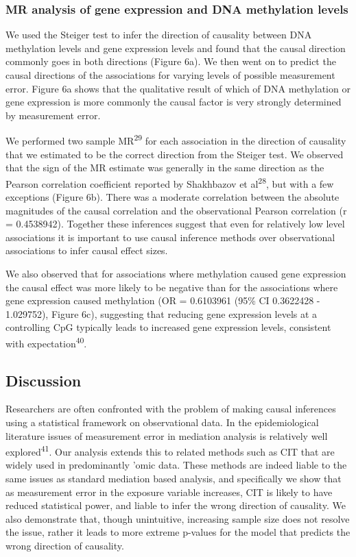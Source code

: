 \documentclass[]{article}
\begin{document}
\subsubsection{MR analysis of gene expression and DNA methylation
levels}\label{mr-analysis-of-gene-expression-and-dna-methylation-levels}

We used the Steiger test to infer the direction of causality between DNA
methylation levels and gene expression levels and found that the causal
direction commonly goes in both directions (Figure 6a). We then went on
to predict the causal directions of the associations for varying levels
of possible measurement error. Figure 6a shows that the qualitative
result of which of DNA methylation or gene expression is more commonly
the causal factor is very strongly determined by measurement error.

We performed two sample MR\textsuperscript{29} for each association in
the direction of causality that we estimated to be the correct direction
from the Steiger test. We observed that the sign of the MR estimate was
generally in the same direction as the Pearson correlation coefficient
reported by Shakhbazov et al\textsuperscript{28}, but with a few
exceptions (Figure 6b). There was a moderate correlation between the
absolute magnitudes of the causal correlation and the observational
Pearson correlation (r = 0.4538942). Together these inferences suggest
that even for relatively low level associations it is important to use
causal inference methods over observational associations to infer causal
effect sizes.

We also observed that for associations where methylation caused gene
expression the causal effect was more likely to be negative than for the
associations where gene expression caused methylation (OR = 0.6103961
(95\% CI 0.3622428 - 1.029752), Figure 6c), suggesting that reducing
gene expression levels at a controlling CpG typically leads to increased
gene expression levels, consistent with expectation\textsuperscript{40}.

\subsection{Discussion}\label{discussion}

Researchers are often confronted with the problem of making causal
inferences using a statistical framework on observational data. In the
epidemiological literature issues of measurement error in mediation
analysis is relatively well explored\textsuperscript{41}. Our analysis
extends this to related methods such as CIT that are widely used in
predominantly 'omic data. These methods are indeed liable to the same
issues as standard mediation based analysis, and specifically we show
that as measurement error in the exposure variable increases, CIT is
likely to have reduced statistical power, and liable to infer the wrong
direction of causality. We also demonstrate that, though unintuitive,
increasing sample size does not resolve the issue, rather it leads to
more extreme p-values for the model that predicts the wrong direction of
causality.
\end{document}
